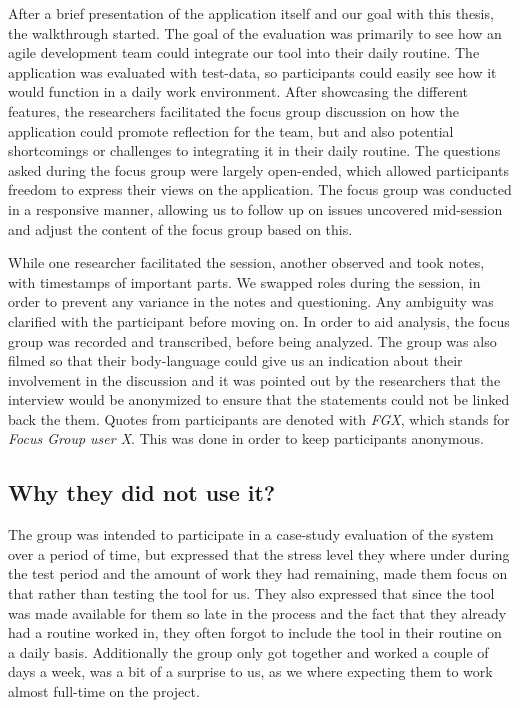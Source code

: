 After a brief presentation of the application itself and our goal with this thesis, the walkthrough started. The goal of the evaluation was primarily to see how an agile development team could integrate our tool into their daily routine. The application was evaluated with test-data, so participants could easily see how it would function in a daily work environment. After showcasing the different features, the researchers facilitated the focus group discussion on how the application could promote reflection for the team, but and also potential shortcomings or challenges to integrating it in their daily routine. The questions asked during the focus group were largely open-ended, which allowed participants freedom to express their views on the application\citep{yin2008case}. The focus group was conducted in a responsive manner, allowing us to follow up on issues uncovered mid-session and adjust the content of the focus group based on this\citep{rubin2011qualitative, wengraf2001qualitative}.

While one researcher facilitated the session, another observed and took notes, with timestamps of important parts. We swapped roles during the session, in order to prevent any variance in the notes and questioning. Any ambiguity was clarified with the participant before moving on. In order to aid analysis, the focus group was recorded and transcribed, before being analyzed. The group was also filmed so that their body-language could give us an indication about their involvement in the discussion and it was pointed out by the researchers that the interview would be anonymized to ensure that the statements could not be linked back the them. Quotes from participants are denoted with \emph{FGX}, which stands for \emph{Focus Group user X}. This was done in order to keep participants anonymous. 

\subsection{Why they did not use it?}
The group was intended to participate in a case-study evaluation of the system over a period of time, but expressed that the stress level they where under during the test period and the amount of work they had remaining, made them focus on that rather than testing the tool for us. They also expressed that since the tool was made available for them so late in the process and the fact that they already had a routine worked in, they often forgot to include the tool in their routine on a daily basis. Additionally the group only got together and worked a couple of days a week, was a bit of a surprise to us, as we where expecting them to work almost full-time on the project.

